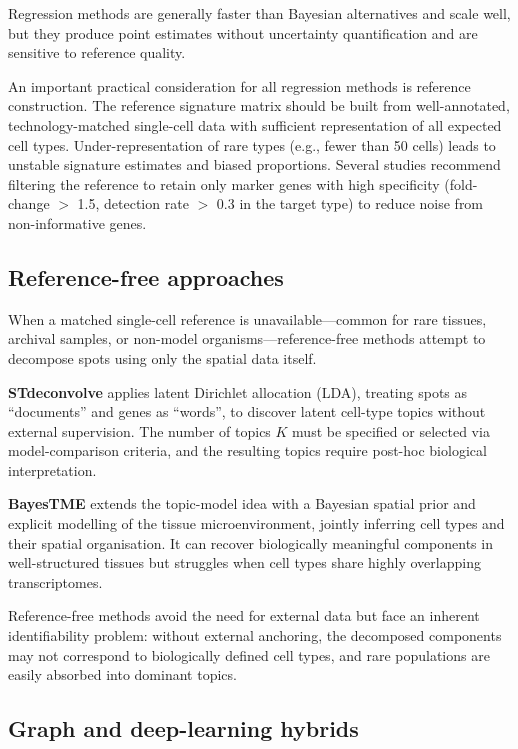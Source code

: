 Regression methods are generally faster than Bayesian alternatives and scale well, but they produce point estimates without uncertainty quantification and are sensitive to reference quality.

An important practical consideration for all regression methods is reference construction. The reference signature matrix should be built from well-annotated, technology-matched single-cell data with sufficient representation of all expected cell types. Under-representation of rare types (e.g., fewer than 50 cells) leads to unstable signature estimates and biased proportions. Several studies recommend filtering the reference to retain only marker genes with high specificity (fold-change $>$ 1.5, detection rate $>$ 0.3 in the target type) to reduce noise from non-informative genes.

\subsection{Reference-free approaches}

When a matched single-cell reference is unavailable---common for rare tissues, archival samples, or non-model organisms---reference-free methods attempt to decompose spots using only the spatial data itself.

\textbf{STdeconvolve} \citep{hao2023stdeconvolve} applies latent Dirichlet allocation (LDA), treating spots as ``documents'' and genes as ``words'', to discover latent cell-type topics without external supervision. The number of topics $K$ must be specified or selected via model-comparison criteria, and the resulting topics require post-hoc biological interpretation.

\textbf{BayesTME} extends the topic-model idea with a Bayesian spatial prior and explicit modelling of the tissue microenvironment, jointly inferring cell types and their spatial organisation. It can recover biologically meaningful components in well-structured tissues but struggles when cell types share highly overlapping transcriptomes.

Reference-free methods avoid the need for external data but face an inherent identifiability problem: without external anchoring, the decomposed components may not correspond to biologically defined cell types, and rare populations are easily absorbed into dominant topics.

\subsection{Graph and deep-learning hybrids}

